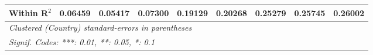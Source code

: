 \begin{table}[htbp]
\begin{tabular}{lcccccccc}
      Within R$^2$                                                       & 0.06459       & 0.05417        & 0.07300  & 0.19129      & 0.20268      & 0.25279      & 0.25745       & 0.26002\\  
      \midrule \midrule
      \multicolumn{9}{l}{\emph{Clustered (Country) standard-errors in parentheses}}\\
      \multicolumn{9}{l}{\emph{Signif. Codes: ***: 0.01, **: 0.05, *: 0.1}}\\
   \end{tabular}
\end{table}


